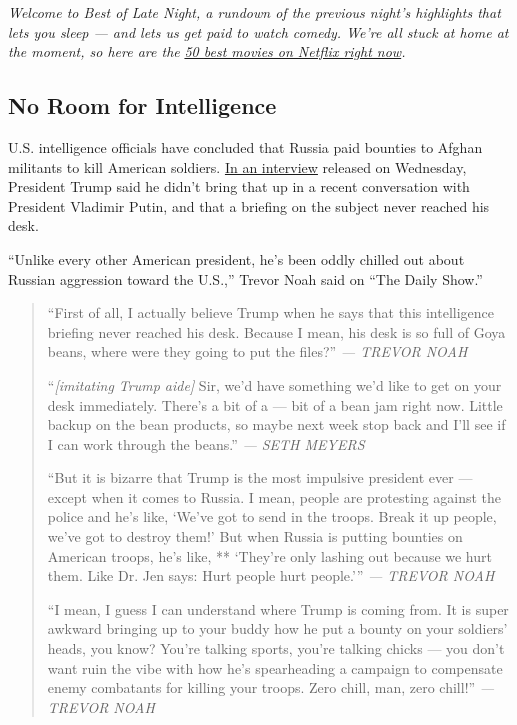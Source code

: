 \emph{Welcome to Best of Late Night, a rundown of the previous night's
highlights that lets you sleep --- and lets us get paid to watch comedy.
We're all stuck at home at the moment, so here are the}
\href{https://www.nytimes.com/interactive/2020/arts/television/best-movies-on-netflix.html}{\emph{50
best movies on Netflix right now}}\emph{.}

\hypertarget{no-room-for-intelligence}{%
\subsection{No Room for Intelligence}\label{no-room-for-intelligence}}

U.S. intelligence officials have concluded that Russia paid bounties to
Afghan militants to kill American soldiers.
\href{https://www.nytimes.com/2020/07/29/us/politics/trump-putin-bounties.html}{In
an interview} released on Wednesday, President Trump said he didn't
bring that up in a recent conversation with President Vladimir Putin,
and that a briefing on the subject never reached his desk.

``Unlike every other American president, he's been oddly chilled out
about Russian aggression toward the U.S.,'' Trevor Noah said on ``The
Daily Show.''

\begin{quote}
``First of all, I actually believe Trump when he says that this
intelligence briefing never reached his desk. Because I mean, his desk
is so full of Goya beans, where were they going to put the files?''
\emph{--- TREVOR NOAH}

``\emph{{[}imitating Trump aide{]}} Sir, we'd have something we'd like
to get on your desk immediately. There's a bit of a --- bit of a bean
jam right now. Little backup on the bean products, so maybe next week
stop back and I'll see if I can work through the beans.'' \emph{--- SETH
MEYERS}

``But it is bizarre that Trump is the most impulsive president ever ---
except when it comes to Russia. I mean, people are protesting against
the police and he's like, `We've got to send in the troops. Break it up
people, we've got to destroy them!' But when Russia is putting bounties
on American troops, he's like, ** `They're only lashing out because we
hurt them. Like Dr. Jen says: Hurt people hurt people.''' \emph{---
TREVOR NOAH}

``I mean, I guess I can understand where Trump is coming from. It is
super awkward bringing up to your buddy how he put a bounty on your
soldiers' heads, you know? You're talking sports, you're talking chicks
--- you don't want ruin the vibe with how he's spearheading a campaign
to compensate enemy combatants for killing your troops. Zero chill, man,
zero chill!'' \emph{--- TREVOR NOAH}
\end{quote}

